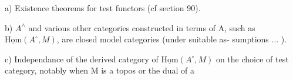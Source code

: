 a) Existence theorems for test functors (cf section 90).

b) $A^{\wedge}$ and various other categories constructed in terms of A, such
as $\underline{\mathrm{Hom}}(A^{\circ},M )$, are closed model categories (under suitable as-%
sumptions ... ).

c) Independance of the derived category of $\underline{\mathrm{Hom}}(A^{\circ},M)$ on the choice
of test category, notably when M is a topos or the dual of a

